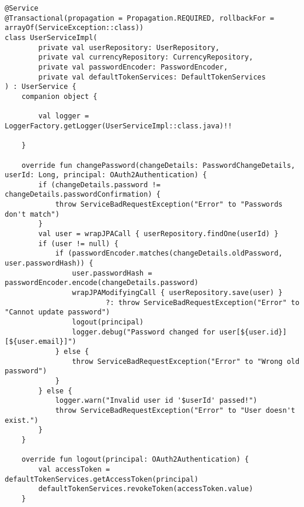 
\begin{lstlisting}[style = ktstyle]
@Service
@Transactional(propagation = Propagation.REQUIRED, rollbackFor = arrayOf(ServiceException::class))
class UserServiceImpl(
        private val userRepository: UserRepository,
        private val currencyRepository: CurrencyRepository,
        private val passwordEncoder: PasswordEncoder,
        private val defaultTokenServices: DefaultTokenServices
) : UserService {
    companion object {

        val logger = LoggerFactory.getLogger(UserServiceImpl::class.java)!!

    }

    override fun changePassword(changeDetails: PasswordChangeDetails, userId: Long, principal: OAuth2Authentication) {
        if (changeDetails.password != changeDetails.passwordConfirmation) {
            throw ServiceBadRequestException("Error" to "Passwords don't match")
        }
        val user = wrapJPACall { userRepository.findOne(userId) }
        if (user != null) {
            if (passwordEncoder.matches(changeDetails.oldPassword, user.passwordHash)) {
                user.passwordHash = passwordEncoder.encode(changeDetails.password)
                wrapJPAModifyingCall { userRepository.save(user) }
                        ?: throw ServiceBadRequestException("Error" to "Cannot update password")
                logout(principal)
                logger.debug("Password changed for user[${user.id}][${user.email}]")
            } else {
                throw ServiceBadRequestException("Error" to "Wrong old password")
            }
        } else {
            logger.warn("Invalid user id '$userId' passed!")
            throw ServiceBadRequestException("Error" to "User doesn't exist.")
        }
    }

    override fun logout(principal: OAuth2Authentication) {
        val accessToken = defaultTokenServices.getAccessToken(principal)
        defaultTokenServices.revokeToken(accessToken.value)
    }


\end{lstlisting}
